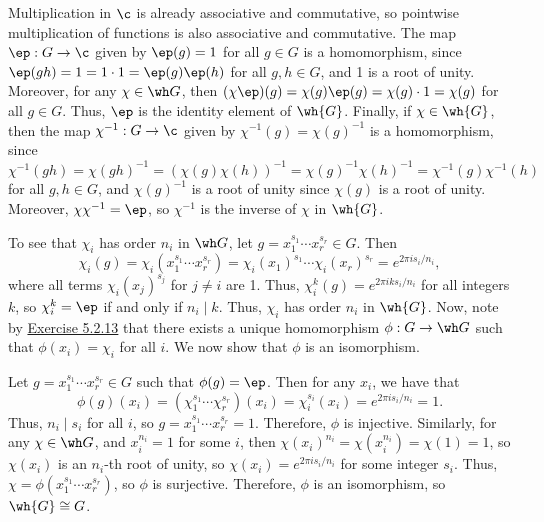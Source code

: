 \begin{solalph}
    \item Multiplication in $\c$ is already associative and commutative, so pointwise multiplication of functions is also associative and commutative. The map $\ep : G \to \c$ given by $\ep(g) = 1$ for all $g \in G$ is a homomorphism, since $\ep(gh) = 1 = 1 \cdot 1 = \ep(g)\ep(h)$ for all $g, h \in G$, and 1 is a root of unity. Moreover, for any $\chi \in \wh G$, then $(\chi\ep)(g) = \chi(g)\ep(g) = \chi(g) \cdot 1 = \chi(g)$ for all $g \in G$. Thus, $\ep$ is the identity element of $\wh{G}$. Finally, if $\chi \in \wh{G}$, then the map $\chi^{-1} : G \to \c$ given by $\chi^{-1}(g) = \chi(g)^{-1}$ is a homomorphism, since $\chi^{-1}(gh) = \chi(gh)^{-1} = (\chi(g)\chi(h))^{-1} = \chi(g)^{-1}\chi(h)^{-1} = \chi^{-1}(g)\chi^{-1}(h)$ for all $g, h \in G$, and $\chi(g)^{-1}$ is a root of unity since $\chi(g)$ is a root of unity. Moreover, $\chi\chi^{-1} = \ep$, so $\chi^{-1}$ is the inverse of $\chi$ in $\wh{G}$.
    \item To see that $\chi_i$ has order $n_i$ in $\wh G$, let $g = x_1^{s_1} \cdots x_r^{s_r} \in G$. Then
    \[\chi_i(g) = \chi_i(x_1^{s_1} \cdots x_r^{s_r}) = \chi_i(x_1)^{s_1} \cdots \chi_i(x_r)^{s_r} = e^{2\pi i s_i / n_i},\]
    where all terms $\chi_i(x_j)^{s_j}$ for $j \neq i$ are 1. Thus, $\chi_i^k(g) = e^{2\pi i k s_i / n_i}$ for all integers $k$, so $\chi_i^k = \ep$ if and only if $n_i \mid k$. Thus, $\chi_i$ has order $n_i$ in $\wh{G}$. Now, note by \hyperref[ex5.2.13]{Exercise 5.2.13} that there exists a unique homomorphism $\phi : G \to \wh G$ such that $\phi(x_i) = \chi_i$ for all $i$. We now show that $\phi$ is an isomorphism.

    Let $g = x_1^{s_1} \cdots x_r^{s_r} \in G$ such that $\phi(g) = \ep$. Then for any $x_i$, we have that
    \[\phi(g)(x_i) = (\chi_1^{s_1} \cdots \chi_r^{s_r})(x_i) = \chi_i^{s_i}(x_i) = e^{2\pi i s_i / n_i} = 1.\]
    Thus, $n_i \mid s_i$ for all $i$, so $g = x_1^{s_1} \cdots x_r^{s_r} = 1$. Therefore, $\phi$ is injective. Similarly, for any $\chi \in \wh G$, and $x_i^{n_i} = 1$ for some $i$, then $\chi(x_i)^{n_i} = \chi(x_i^{n_i}) = \chi(1) = 1$, so $\chi(x_i)$ is an $n_i$-th root of unity, so $\chi(x_i) = e^{2\pi i s_i / n_i}$ for some integer $s_i$. Thus, $\chi = \phi(x_1^{s_1} \cdots x_r^{s_r})$, so $\phi$ is surjective. Therefore, $\phi$ is an isomorphism, so $\wh{G} \cong G$.
\end{solalph}

